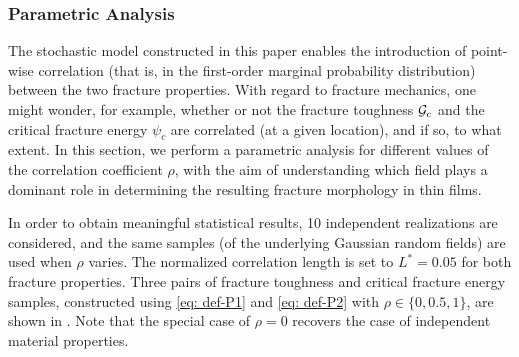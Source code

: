 







\subsubsection{Parametric Analysis}

The stochastic model constructed in this paper enables the introduction of point-wise correlation (that is, in the first-order marginal probability distribution) between the two fracture properties.
With regard to fracture mechanics, one might wonder, for example, whether or not the fracture toughness ${\mathcal{G}_c}$ and the critical fracture energy $\psi_c$ are correlated (at a given location), and if so, to what extent. In this section, we perform a parametric analysis for different values of the correlation coefficient $\rho$, with the aim of understanding which field plays a dominant role in determining the resulting fracture morphology in thin films.

In order to obtain meaningful statistical results, 10 independent realizations are considered, and the same samples (of the underlying Gaussian random fields) are used when $\rho$ varies. The normalized correlation length is set to $L^* = 0.05$ for both fracture properties.
Three pairs of fracture toughness and critical fracture energy samples, constructed using \eqref{eq: def-P1} and \eqref{eq: def-P2} with $\rho \in \{0, 0.5, 1\}$, are shown in . Note that the special case of $\rho = 0$ recovers the case of independent material properties.

